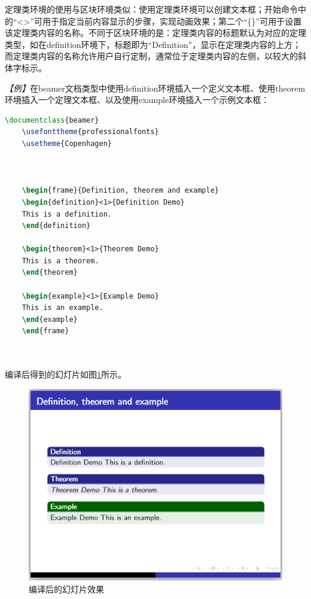 定理类环境的使用与区块环境类似：使用定理类环境可以创建文本框；开始命令中的“<>”可用于指定当前内容显示的步骤，实现动画效果；第二个“\{\}”可用于设置该定理类内容的名称。不同于区块环境的是：定理类内容的标题默认为对应的定理类型，如在definition环境下，标题即为“Definition”，显示在定理类内容的上方；而定理类内容的名称允许用户自行定制，通常位于定理类内容的左侧，以较大的斜体字标示。

\emph{【例】}在beamer文档类型中使用definition环境插入一个定义文本框、使用theorem环境插入一个定理文本框、以及使用example环境插入一个示例文本框：
\begin{lstlisting}[language=TeX]
    \documentclass{beamer}
    \usefonttheme{professionalfonts}
    \usetheme{Copenhagen}

    

    \begin{frame}{Definition, theorem and example}
    \begin{definition}<1>{Definition Demo}
    This is a definition.
    \end{definition}

    \begin{theorem}<1>{Theorem Demo}
    This is a theorem.
    \end{theorem}

    \begin{example}<1>{Example Demo}
    This is an example.
    \end{example}
    \end{frame}

    
\end{lstlisting}

编译后得到的幻灯片如图\ref{fig:918}所示。

\begin{figure}[htbp]
    \centering
    \includegraphics[width = 0.6\linewidth]{images/ch_9/NEWexample04.png}
    \caption{编译后的幻灯片效果}
    \label{fig:918}
\end{figure}


